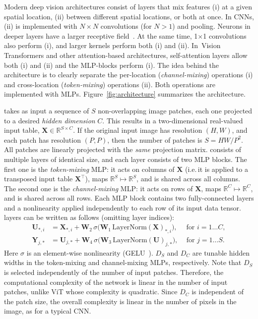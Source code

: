 Modern deep vision architectures consist of layers that mix features (i) at a given spatial location, (ii) between different spatial locations, or both at once.
In CNNs, (ii) is implemented with $N\times N$ convolutions (for $N>1$) and pooling.
Neurons in deeper layers have a larger receptive field~\citep{araujo2019computing,luo2017understanding}.
At the same time, 1$\times$1 convolutions also perform (i), and larger kernels perform both (i) and (ii).
In~Vision Transformers and other attention-based architectures, self-attention layers allow both (i) and (ii) and the MLP-blocks perform (i).
The idea behind the \name{} architecture is to clearly separate the per-location (\emph{channel-mixing}) operations (i) and cross-location (\emph{token-mixing}) operations (ii).
Both operations are implemented with MLPs.
Figure~\ref{fig:architecture} summarizes the architecture. 

\name{} takes as input a sequence of $S$ non-overlapping image patches, each one projected to a desired \emph{hidden dimension} $C$.
This results in a two-dimensional real-valued input table, $\mathbf{X}\in \mathbb{R}^{S\times C}$.
If the original input image has resolution $(H, W)$,
and each patch has resolution $(P, P)$,
then the number of patches is $S = HW/P^2$.
All patches are linearly projected with the \emph{same} projection matrix.
\name{} consists of multiple layers of identical size, and each layer consists of two MLP blocks.
The first one is the \emph{token-mixing} MLP: it acts on columns of $\mathbf{X}$ (i.e.\,it is applied to a transposed input table $\mathbf{X}^\top$), maps $\mathbb{R}^S\mapsto \mathbb{R}^S$, and is shared across all columns.
The second one is the \emph{channel-mixing} MLP: it acts on rows of $\mathbf{X}$, maps $\mathbb{R}^C\mapsto \mathbb{R}^C$, and is shared across all rows.
Each MLP block contains two fully-connected layers and a nonlinearity applied independently to each row of its input data tensor. 
\name{} layers can be written as follows (omitting layer indices):
\begin{align}
\label{eq:channel-wise-mlp}
\mathbf{U}_{*, i} &= \mathbf{X}_{*, i} + \mathbf{W}_2\,\sigma\bigl( \mathbf{W}_1\, \text{LayerNorm}(\mathbf{X})_{*, i} \bigr),\quad\;\text{for }i=1\ldots C,\\
\mathbf{Y}_{j,*} &= \mathbf{U}_{j,*} + \mathbf{W}_4\,\sigma\bigl( \mathbf{W}_3\, \text{LayerNorm}(\mathbf{U})_{j,*} \bigr),\quad\,\text{for }j=1\ldots S. \nonumber
\end{align}
Here $\sigma$ is an element-wise nonlinearity (GELU~\cite{hendrycks2016gelu}).
$D_S$ and $D_C$ are tunable hidden widths in the token-mixing and channel-mixing MLPs, respectively.
Note that $D_S$ is selected independently of the number of input patches.
Therefore, the computational complexity of the network is linear in the number of input patches, unlike ViT whose complexity is quadratic.
Since $D_C$ is independent of the patch size, the overall complexity is linear in the number of pixels in the image, as for a typical CNN.

